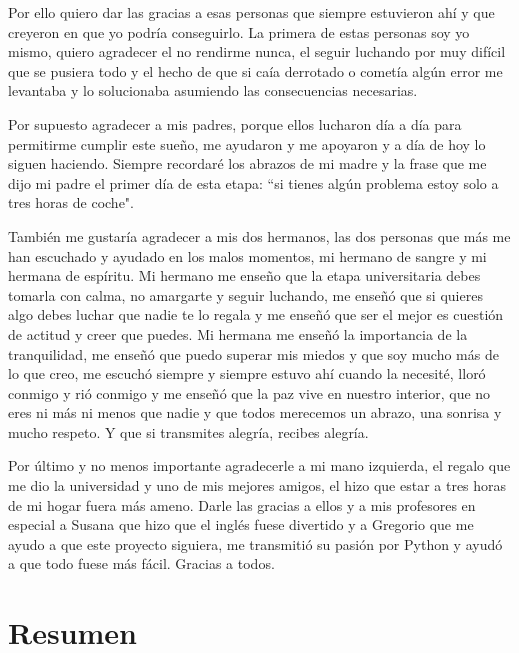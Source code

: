 \documentclass[a4paper, 12pt]{book}
\begin{document}
Por ello quiero dar las gracias a esas personas que siempre estuvieron ahí y que creyeron en que yo podría conseguirlo. La primera de estas personas soy yo mismo, quiero agradecer el no rendirme nunca, el seguir luchando por muy difícil que se pusiera todo y el hecho de que si caía derrotado o cometía algún error me levantaba y lo solucionaba asumiendo las consecuencias necesarias.

Por supuesto agradecer a mis padres, porque ellos lucharon día a día para permitirme cumplir este sueño, me ayudaron y me apoyaron y a día de hoy lo siguen haciendo. Siempre recordaré los abrazos de mi madre y la frase que me dijo mi padre el primer día de esta etapa: ``si tienes algún problema estoy solo a tres horas de coche".

También me gustaría agradecer a mis dos hermanos, las dos personas que más me han escuchado y ayudado en los malos momentos, mi hermano de sangre y mi hermana de espíritu. Mi hermano me enseño que la etapa universitaria debes tomarla con calma, no amargarte y seguir luchando, me enseñó que si quieres algo debes luchar que nadie te lo regala y me enseñó que ser el mejor es cuestión de actitud y creer que puedes. Mi hermana me enseñó la importancia de la tranquilidad, me enseñó que puedo superar mis miedos y que soy mucho más de lo que creo, me escuchó siempre y siempre estuvo ahí cuando la necesité, lloró conmigo y rió conmigo y me enseñó que la paz vive en nuestro interior, que no eres ni más ni menos que nadie y que todos merecemos un abrazo, una sonrisa y mucho respeto. Y que si transmites alegría, recibes alegría.

Por último y no menos importante agradecerle a mi mano izquierda, el regalo que me dio la universidad y uno de mis mejores amigos, el hizo que estar a tres horas de mi hogar fuera más ameno. Darle las gracias a ellos y a mis profesores en especial a Susana que hizo que el inglés fuese divertido y a Gregorio que me ayudo a que este proyecto siguiera, me transmitió su pasión por Python y ayudó a que todo fuese más fácil. Gracias a todos.


\chapter*{Resumen}
\end{document}
